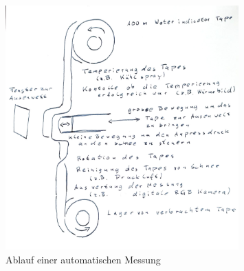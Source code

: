 \begin{figure}
    \centering
    \includegraphics[width=0.8\textwidth]{Bilder/KonzeptAut.jpeg}
    \caption{Ablauf einer automatischen Messung}
    \label{fig:AutMess}
\end{figure}
